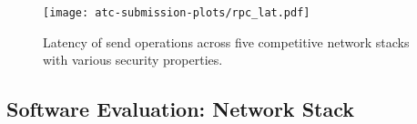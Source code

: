 
\begin{figure*}
    \centering
   \texttt{[image: atc-submission-plots/rpc\_lat.pdf]} 
   \vspace{-12pt}
  \caption{Latency of send operations across five competitive network stacks with various security properties.}
  \label{fig:net_latencies}
   \vspace{-10pt}
\end{figure*}






\vspace{-4pt}
\subsection{Software Evaluation: \projecttitle{} Network Stack}\label{subsec:net_lib}
\vspace{-2pt}



